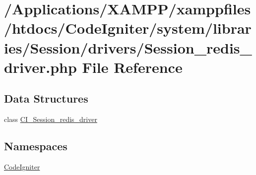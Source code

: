 \hypertarget{_session__redis__driver_8php}{}\section{/\+Applications/\+X\+A\+M\+P\+P/xamppfiles/htdocs/\+Code\+Igniter/system/libraries/\+Session/drivers/\+Session\+\_\+redis\+\_\+driver.php File Reference}
\label{_session__redis__driver_8php}
\subsection*{Data Structures}
\begin{DoxyCompactItemize}
\item 
class \mbox{\hyperlink{class_c_i___session__redis__driver}{C\+I\+\_\+\+Session\+\_\+redis\+\_\+driver}}
\end{DoxyCompactItemize}
\subsection*{Namespaces}
\begin{DoxyCompactItemize}
\item 
 \mbox{\hyperlink{namespace_code_igniter}{Code\+Igniter}}
\end{DoxyCompactItemize}
